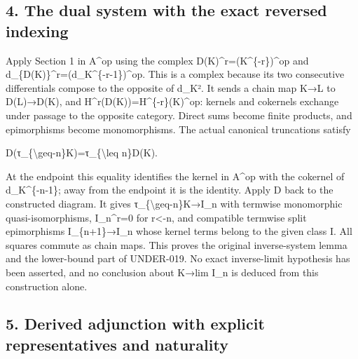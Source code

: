 \documentclass[11pt]{article}
\begin{document}
\subsection{4. The dual system with the exact reversed indexing}\label{proofs-9206-9744-the-dual-system-with-the-exact-reversed-indexing}

Apply Section 1 in A\^{}op using the complex D(K)\allowbreak{}\textasciicircum{}r\allowbreak{}=(K\textasciicircum{}\{-r\})\allowbreak{}\textasciicircum{}op and d\_\allowbreak{}\{D(K)\allowbreak{}\}\textasciicircum{}r\allowbreak{}=(d\_\allowbreak{}K\textasciicircum{}\{-r-1\})\allowbreak{}\textasciicircum{}op. This is a complex because its two consecutive differentials compose to the opposite of d\_\allowbreak{}K². It sends a chain map K\allowbreak{}→L to D(L)\allowbreak{}\allowbreak{}→D(K)\allowbreak{},\allowbreak{} and H\textasciicircum{}r(D(K)\allowbreak{})\allowbreak{}\allowbreak{}=H\textasciicircum{}\{-r\}(K)\allowbreak{}\textasciicircum{}op:\allowbreak{} kernels and cokernels exchange under passage to the opposite category. Direct sums become finite products,\allowbreak{} and epimorphisms become monomorphisms. The actual canonical truncations satisfy

D(τ\_\allowbreak{}\{\textbackslash{}geq-n\}K)\allowbreak{}\allowbreak{}=τ\_\allowbreak{}\{\textbackslash{}leq n\}D(K)\allowbreak{}.

At the endpoint this equality identifies the kernel in A\^{}op with the cokernel of d\_\allowbreak{}K\textasciicircum{}\{-n-1\}; away from the endpoint it is the identity. Apply D back to the constructed diagram. It gives τ\_\allowbreak{}\{\textbackslash{}geq-n\}K\allowbreak{}→I\_\allowbreak{}n with termwise monomorphic quasi-isomorphisms,\allowbreak{} I\_\allowbreak{}n\textasciicircum{}r\allowbreak{}=0 for r<-n,\allowbreak{} and compatible termwise split epimorphisms I\_\allowbreak{}\{n\allowbreak{}+1\}\allowbreak{}→I\_\allowbreak{}n whose kernel terms belong to the given class I. All squares commute as chain maps. This proves the original inverse-system lemma and the lower-bound part of UNDER-019. No exact inverse-limit hypothesis has been asserted,\allowbreak{} and no conclusion about K\allowbreak{}→lim I\_\allowbreak{}n is deduced from this construction alone.

\subsection{5. Derived adjunction with explicit representatives and naturality}\label{proofs-9206-9744-derived-adjunction-with-explicit-representatives-and-naturality}
\end{document}
